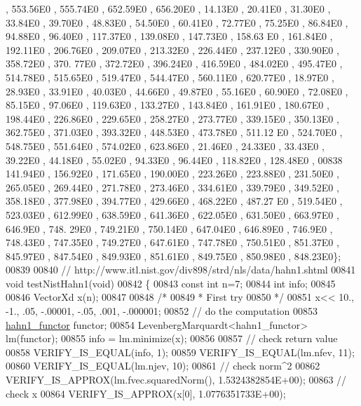 \begin{DoxyCode}
       , 553.56E0 , 555.74E0 , 652.59E0 , 656.20E0 , 14.13E0 , 20.41E0 , 31.30E0 , 33.84E0 , 39.70E0 , 48.83E0 , 
      54.50E0 , 60.41E0 , 72.77E0 , 75.25E0 , 86.84E0 , 94.88E0 , 96.40E0 , 117.37E0 , 139.08E0 , 147.73E0 , 158.63
      E0 , 161.84E0 , 192.11E0 , 206.76E0 , 209.07E0 , 213.32E0 , 226.44E0 , 237.12E0 , 330.90E0 , 358.72E0 , 370.
      77E0 , 372.72E0 , 396.24E0 , 416.59E0 , 484.02E0 , 495.47E0 , 514.78E0 , 515.65E0 , 519.47E0 , 544.47E0 , 
      560.11E0 , 620.77E0 , 18.97E0 , 28.93E0 , 33.91E0 , 40.03E0 , 44.66E0 , 49.87E0 , 55.16E0 , 60.90E0 , 72.08E0 
      , 85.15E0 , 97.06E0 , 119.63E0 , 133.27E0 , 143.84E0 , 161.91E0 , 180.67E0 , 198.44E0 , 226.86E0 , 229.65E0 
      , 258.27E0 , 273.77E0 , 339.15E0 , 350.13E0 , 362.75E0 , 371.03E0 , 393.32E0 , 448.53E0 , 473.78E0 , 511.12
      E0 , 524.70E0 , 548.75E0 , 551.64E0 , 574.02E0 , 623.86E0 , 21.46E0 , 24.33E0 , 33.43E0 , 39.22E0 , 44.18E0 ,
       55.02E0 , 94.33E0 , 96.44E0 , 118.82E0 , 128.48E0 ,
00838 141.94E0 , 156.92E0 , 171.65E0 , 190.00E0 , 223.26E0 , 223.88E0 , 231.50E0 , 265.05E0 , 269.44E0 , 271.78E0
       , 273.46E0 , 334.61E0 , 339.79E0 , 349.52E0 , 358.18E0 , 377.98E0 , 394.77E0 , 429.66E0 , 468.22E0 , 487.27
      E0 , 519.54E0 , 523.03E0 , 612.99E0 , 638.59E0 , 641.36E0 , 622.05E0 , 631.50E0 , 663.97E0 , 646.9E0  , 748.
      29E0 , 749.21E0 , 750.14E0 , 647.04E0 , 646.89E0 , 746.9E0  , 748.43E0 , 747.35E0 , 749.27E0 , 647.61E0 , 
      747.78E0 , 750.51E0 , 851.37E0 , 845.97E0 , 847.54E0 , 849.93E0 , 851.61E0 , 849.75E0 , 850.98E0 , 848.23E0\};
00839 
00840 \textcolor{comment}{// http://www.itl.nist.gov/div898/strd/nls/data/hahn1.shtml}
00841 \textcolor{keywordtype}{void} testNistHahn1(\textcolor{keywordtype}{void})
00842 \{
00843   \textcolor{keyword}{const} \textcolor{keywordtype}{int}  n=7;
00844   \textcolor{keywordtype}{int} info;
00845 
00846   VectorXd x(n);
00847 
00848   \textcolor{comment}{/*}
00849 \textcolor{comment}{   * First try}
00850 \textcolor{comment}{   */}
00851   x<< 10., -1., .05, -.00001, -.05, .001, -.000001;
00852   \textcolor{comment}{// do the computation}
00853   \hyperlink{structhahn1__functor}{hahn1\_functor} functor;
00854   LevenbergMarquardt<hahn1\_functor> lm(functor);
00855   info = lm.minimize(x);
00856 
00857   \textcolor{comment}{// check return value}
00858   VERIFY\_IS\_EQUAL(info, 1);
00859   VERIFY\_IS\_EQUAL(lm.nfev, 11);
00860   VERIFY\_IS\_EQUAL(lm.njev, 10);
00861   \textcolor{comment}{// check norm^2}
00862   VERIFY\_IS\_APPROX(lm.fvec.squaredNorm(), 1.5324382854E+00);
00863   \textcolor{comment}{// check x}
00864   VERIFY\_IS\_APPROX(x[0], 1.0776351733E+00);

\end{DoxyCode}
